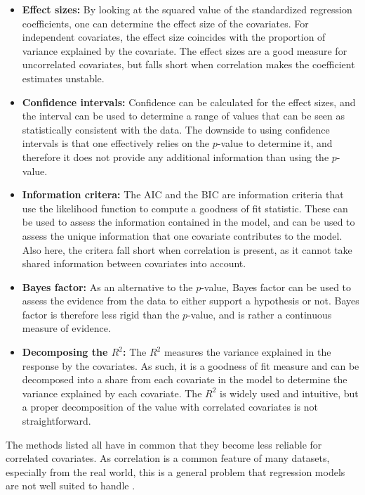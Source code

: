 \begin{itemize}
    \item \textbf{Effect sizes:} By looking at the squared value of the standardized regression coefficients, one can determine the effect size of the covariates. For independent covariates, the effect size coincides with the proportion of variance explained by the covariate. The effect sizes are a good measure for uncorrelated covariates, but falls short when correlation makes the coefficient estimates unstable.
    \item \textbf{Confidence intervals:} Confidence can be calculated for the effect sizes, and the interval can be used to determine a range of values that can be seen as statistically consistent with the data. The downside to using confidence intervals is that one effectively relies on the $p$-value to determine it, and therefore it does not provide any additional information than using the $p$-value.
    \item \textbf{Information critera:} The AIC \citep{Akaike_AIC} and the BIC \citep{Schwarz_BIC} are information criteria that use the likelihood function to compute a goodness of fit statistic. These can be used to assess the information contained in the model, and can be used to assess the unique information that one covariate contributes to the model. Also here, the critera fall short when correlation is present, as it cannot take shared information between covariates into account. 
    \item \textbf{Bayes factor:} As an alternative to the $p$-value, Bayes factor can be used to assess the evidence from the data to either support a hypothesis or not. Bayes factor is therefore less rigid than the $p$-value, and is rather a continuous measure of evidence.
    \item \textbf{Decomposing the $R^2$:} The $R^2$ measures the variance explained in the response by the covariates. As such, it is a goodness of fit measure and can be decomposed into a share from each covariate in the model to determine the variance explained by each covariate. The $R^2$ is widely used and intuitive, but a proper decomposition of the value with correlated covariates is not straightforward.
\end{itemize}
The methods listed all have in common that they become less reliable for correlated covariates. As correlation is a common feature of many datasets, especially from the real world, this is a general problem that regression models are not well suited to handle \citep{Gromping_2015}. 

